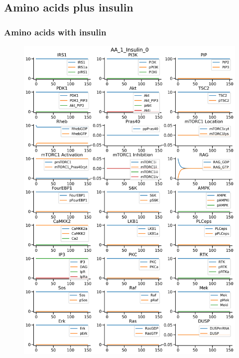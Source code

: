 \documentclass{beamer}
\begin{document}
\subsection{Amino acids plus insulin} %
\begin{frame}
\frametitle{Amino acids with insulin}
\begin{figure}
    \begin{minipage}{0.45\textwidth}
        \centering
        \includegraphics[width=\textwidth]{../simulations/ExtendedPI3KModel/validations/AAWithInsulin/AA_1_Insulin_0-2.png}
    \end{minipage}
    \begin{minipage}{0.45\textwidth}
        \centering

\end{minipage}
\end{figure}
\end{frame}
\end{document}
